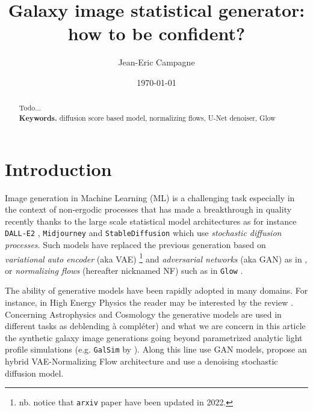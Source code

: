 \documentclass[11pt]{amsart}
\title{Galaxy image statistical generator: how to be confident?}
\author{Jean-Eric Campagne}
\date{\today}
\newenvironment{nouppercase}{%
  \let\uppercase\relax%
  \renewcommand{\uppercasenonmath}[1]{}}{}
\begin{document}
\begin{nouppercase}
\maketitle
\end{nouppercase}
%
\begin{abstract}
Todo...
\\
\smallskip
\noindent \textbf{Keywords.} diffusion score based model, normalizing flows, U-Net denoiser, Glow
\end{abstract}

\section{Introduction}
\label{sec:Intro}
Image generation in Machine Learning (ML) is a challenging task especially in the context of non-ergodic processes that has made a breakthrough in quality recently thanks to the large scale statistical model architectures as for instance \texttt{DALL-E2} \citep{ramesh2022}, \texttt{Midjourney} \citep{Oppenlaender2022} and \texttt{StableDiffusion} \citep{Rombach2022} which use \textit{stochastic diffusion processes}. Such models have replaced the previous generation based on \textit{variational auto encoder} (aka VAE) \citep{Kingma2014}\footnote{nb. notice that \texttt{arxiv} paper have been updated in 2022.} and  \textit{adversarial networks} (aka GAN) \citep{goodfellow2014generative} as in \citep[e.g.]{KarrasALL18,brock2018large}, or \textit{normalizing flows} (hereafter nicknamed NF) such as in \texttt{Glow} \citep{Kingma2018}. 


The ability of generative models have been rapidly adopted in many domains. For instance, in High Energy Physics the reader may be interested by the review \cite{PhysRevD.107.076017}. Concerning Astrophysics and Cosmology the generative models are used in different tasks as deblending \citep{Hemmati_2022,Arcelin2020} {\color{red} à compléter}) and what we are concern in this article the synthetic galaxy image generations  going beyond parametrized analytic light profile simulations (e.g. \texttt{GalSim} by \cite{ROWE2015121}). Along this line \citep{ravanbakhsh2016,Fussell2019} use GAN models, \cite{Lanusse2021} propose an hybrid VAE-Normalizing Flow architecture and \cite{smith2021} use a denoising stochastic diffusion model. 
\end{document}
